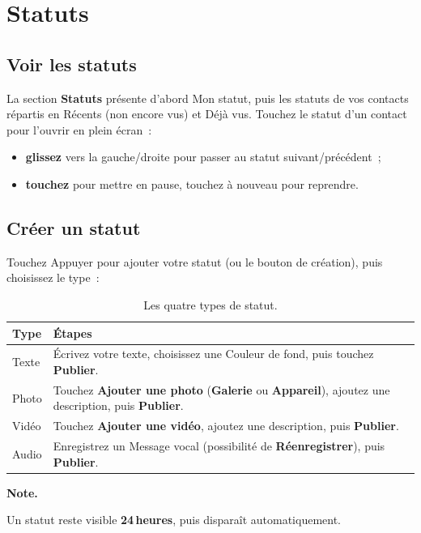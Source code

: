 \documentclass[11pt,a4paper,oneside]{report}
\newcommand{\bouton}[1]{\textbf{\textsf{#1}}}
\newcommand{\champ}[1]{\og{}#1\fg{}}
\newcommand{\thd}[1]{\textbf{\textcolor{AlanyaIndigoDark}{#1}}}
\newenvironment{note}[1][Note]{%
  \begin{tcolorbox}[enhanced, frame hidden, interior hidden,
    borderline west={3pt}{0pt}{AlanyaIndigo}, left=10pt, top=3pt, bottom=3pt,
    sharp corners, colback=white, before skip=\medskipamount, after skip=\medskipamount]%
  \small\textbf{\textcolor{AlanyaIndigoDark}{#1.}}\space\ignorespaces
}{\end{tcolorbox}}
\begin{document}
\chapter{Statuts}
\label{chap:statuts}

\section{Voir les statuts}
La section \bouton{Statuts} pr\'{e}sente d'abord \champ{Mon statut}, puis les statuts
de vos contacts r\'{e}partis en \champ{R\'{e}cents} (non encore vus) et \champ{D\'{e}j\`{a}
vus}. Touchez le statut d'un contact pour l'ouvrir en plein \'{e}cran~:
\begin{itemize}[leftmargin=1.3em]
  \item \textbf{glissez} vers la gauche/droite pour passer au statut suivant/pr\'{e}c\'{e}dent~;
  \item \textbf{touchez} pour mettre en pause, touchez \`{a} nouveau pour reprendre.
\end{itemize}

\section{Cr\'{e}er un statut}
Touchez \champ{Appuyer pour ajouter votre statut} (ou le bouton de cr\'{e}ation), puis
choisissez le type~:
\begin{table}[H]
\centering\small
\begin{tabularx}{\linewidth}{@{}l X@{}}
\toprule
\thd{Type} & \thd{\'{E}tapes}\\
\midrule
Texte & \'{E}crivez votre texte, choisissez une \champ{Couleur de fond}, puis touchez \bouton{Publier}.\\
Photo & Touchez \bouton{Ajouter une photo} (\bouton{Galerie} ou \bouton{Appareil}), ajoutez une description, puis \bouton{Publier}.\\
Vid\'{e}o & Touchez \bouton{Ajouter une vid\'{e}o}, ajoutez une description, puis \bouton{Publier}.\\
Audio & Enregistrez un \champ{Message vocal} (possibilit\'{e} de \bouton{R\'{e}enregistrer}), puis \bouton{Publier}.\\
\bottomrule
\end{tabularx}
\caption{Les quatre types de statut.}
\end{table}

\begin{note}
Un statut reste visible \textbf{24\,heures}, puis dispara\^{i}t automatiquement.
\end{note}
\end{document}
